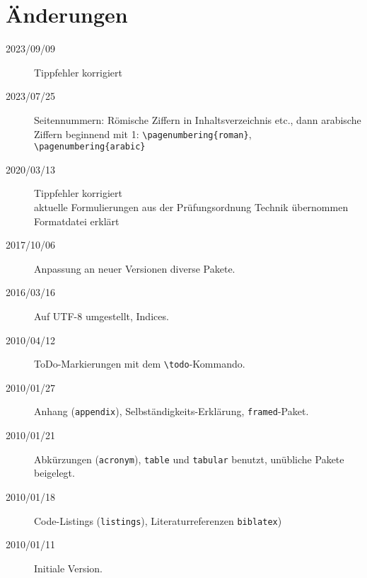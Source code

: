 
\chapter*{Änderungen}

\begin{description}
\item[2023/09/09] Tippfehler korrigiert
\item[2023/07/25] Seitennummern: Römische Ziffern in Inhaltsverzeichnis etc., dann arabische Ziffern
                  beginnend mit 1: \verb+\pagenumbering{roman}+,
                  \verb+\pagenumbering{arabic}+
\item[2020/03/13] Tippfehler korrigiert\\
                  aktuelle Formulierungen aus der Prüfungsordnung Technik übernommen\\
                  Formatdatei erklärt
\item[2017/10/06] Anpassung an neuer Versionen diverse Pakete.
\item[2016/03/16] Auf UTF-8 umgestellt, Indices.
\item[2010/04/12] ToDo-Markierungen mit dem \verb+\todo+-Kommando.
\item[2010/01/27] Anhang (\texttt{appendix}), Selbständigkeits-Erklärung, \texttt{framed}-Paket.
\item[2010/01/21] Abkürzungen (\texttt{acronym}), \texttt{table} und \texttt{tabular} benutzt,
     unübliche Pakete beigelegt.
\item[2010/01/18] Code-Listings (\texttt{listings}), Literaturreferenzen \texttt{biblatex})
\item[2010/01/11] Initiale Version.
\end{description}

